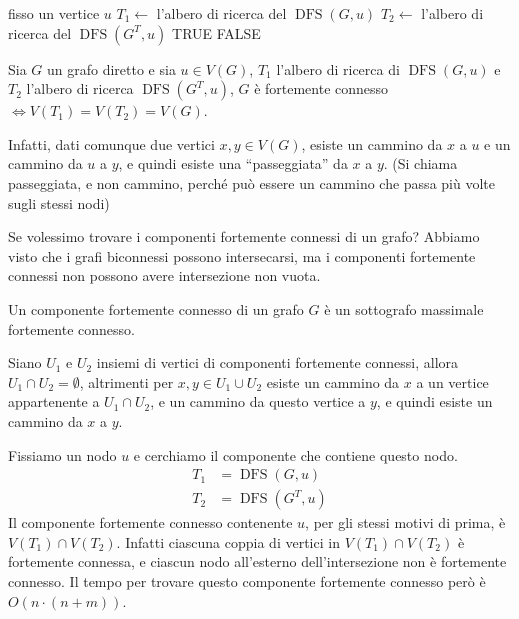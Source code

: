 \begin{algorithm}
\caption{Test per la forte connettivit\`a in un grafo diretto}
\begin{algorithmic}[1]
    \State fisso un vertice $u$
    \State $T_1 \gets$ l'albero di ricerca del $\operatorname{DFS}(G, u)$
    \State $T_2 \gets$ l'albero di ricerca del $\operatorname{DFS}(G^T, u)$
        \State \Return TRUE
    \Else
        \State \Return FALSE
    \EndIf
\end{algorithmic}
\end{algorithm}

\begin{prop}
Sia $G$ un grafo diretto e sia $u \in V(G)$, $T_1$ l'albero di ricerca di $\operatorname{DFS}(G, u)$ e $T_2$ l'albero di ricerca $\operatorname{DFS}(G^T, u)$, $G$ \`e fortemente connesso $\iff V(T_1) = V(T_2) = V(G)$.
\end{prop}

Infatti, dati comunque due vertici $x, y \in V(G)$, esiste un cammino da $x$ a $u$ e un cammino da $u$ a $y$, e quindi esiste una ``passeggiata'' da $x$ a $y$. (Si chiama passeggiata, e non cammino, perch\'e pu\`o essere un cammino che passa pi\`u volte sugli stessi nodi)

Se volessimo trovare i componenti fortemente connessi di un grafo? Abbiamo visto che i grafi biconnessi possono intersecarsi, ma i componenti fortemente connessi non possono avere intersezione non vuota.

\begin{defn}
Un componente fortemente connesso di un grafo $G$ \`e un sottografo massimale fortemente connesso.
\end{defn}

Siano $U_1$ e $U_2$ insiemi di vertici di componenti fortemente connessi, allora $U_1 \cap U_2 = \emptyset$, altrimenti per $x, y \in U_1 \cup U_2$ esiste un cammino da $x$ a un vertice appartenente a $U_1 \cap U_2$, e un cammino da questo vertice a $y$, e quindi esiste un cammino da $x$ a $y$.

Fissiamo un nodo $u$ e cerchiamo il componente che contiene questo nodo.
\begin{align*}
T_1 &= \operatorname{DFS}(G, u) \\
T_2 &= \operatorname{DFS}(G^T, u)
\end{align*}
Il componente fortemente connesso contenente $u$, per gli stessi motivi di prima, \`e $V(T_1) \cap V(T_2)$. Infatti ciascuna coppia di vertici in $V(T_1) \cap V(T_2)$ \`e fortemente connessa, e ciascun nodo all'esterno dell'intersezione non \`e fortemente connesso. Il tempo per trovare questo componente fortemente connesso per\`o \`e $O(n \cdot (n + m))$.

